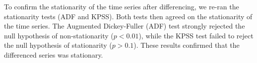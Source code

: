 To confirm the stationarity of the time series after differencing, we re-ran the stationarity tests (ADF and KPSS). Both tests then agreed on the stationarity of the time series. The Augmented Dickey-Fuller (ADF) test strongly rejected the null hypothesis of non-stationarity ($p < 0.01$), while the KPSS test failed to reject the null hypothesis of stationarity ($p > 0.1$). These results confirmed that the differenced series was stationary.